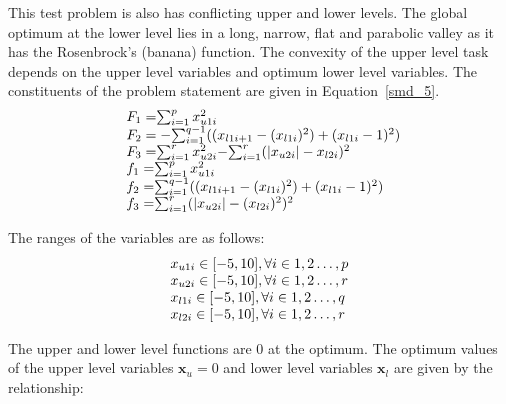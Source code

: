 This test problem is also has conflicting upper and lower levels. The global optimum at the lower level lies in a long, narrow, flat and parabolic valley as it has the Rosenbrock's (banana) function. The convexity of the upper level task depends on the upper level variables and optimum lower level variables. The constituents of the problem statement are given in Equation~\ref{smd_5}.
\begin{equation}
\begin{array}{lr}
\text{}\hspace{2mm} F_1=$$\sum_{	i=1}^{p} x_{u1i}^{2} $$\\
\text{}\hspace{2mm} F_2=-$$\sum_{	i=1}^{q-1} ((x_{l1i+1}-(x_{l1i})^{2}) +(x_{l1i}-1)^{2})$$\\
\text{}\hspace{2mm} F_3=$$\sum_{	i=1}^{r} x_{u2i}^{2} $$-$$\sum_{	i=1}^{r} (|x_{u2i}|-x_{l2i})^{2} $$\\

\text{}\hspace{2mm} f_1=$$\sum_{	i=1}^{p} x_{u1i}^{2} $$\\
\text{}\hspace{2mm} f_2=$$\sum_{	i=1}^{q-1} ((x_{l1i+1}-(x_{l1i})^{2}) +(x_{l1i}-1)^{2})$$\\
\text{}\hspace{2mm} f_3=$$\sum_{	i=1}^{r} (|x_{u2i}|-(x_{l2i})^{2})^{2} $$\\

\end{array}
\label{smd_5}
\end{equation}

The ranges of the variables are as follows:
\begin{equation}
\begin{array}{lr}
$$x_{u1i} \in  [-5,10],          \forall i \in {1,2\ldots,p}$$\\
$$x_{u2i} \in  [-5,10],          \forall i \in {1,2\ldots,r}$$\\
$$x_{l1i} \in  [-5,10],          \forall i \in {1,2\ldots,q}$$\\
$$x_{l2i} \in  [-5,10],          \forall i \in {1,2\ldots,r}$$
\end{array}
\label{smd_5_sub}
\end{equation}

The upper and lower level functions are 0 at the optimum. The optimum values of the upper level variables $\mathbf{x}_u=0$ and lower level variables $\mathbf{x}_l$ are given by the relationship: 

